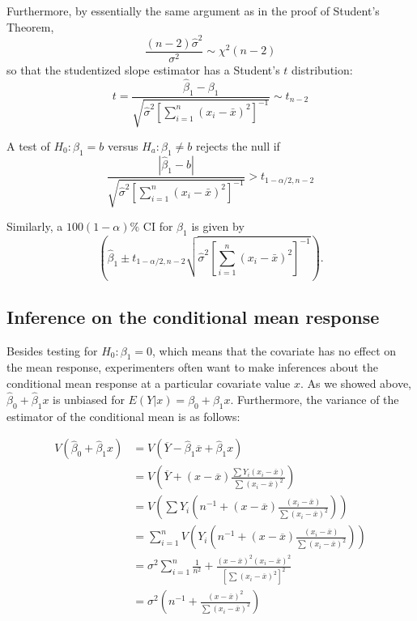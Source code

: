 \documentclass[
]{book}
\begin{document}
Furthermore, by essentially the same argument as in the proof of Student's Theorem,
\[\frac{(n-2)\hat\sigma^2}{\sigma^2}\sim \chi^2(n-2)\]
so that the studentized slope estimator has a Student's \(t\) distribution:
\[t = \frac{\hat\beta_1 - \beta_1}{\sqrt{\hat\sigma^2 \left[\sum_{i=1}^n (x_i - \bar x)^2\right]^{-1}}}\sim t_{n-2}\]

A test of \(H_0:\beta_1 = b\) versus \(H_a:\beta_1 \ne b\) rejects the null if
\[\frac{|\hat\beta_1 - b|}{\sqrt{\hat\sigma^2 \left[\sum_{i=1}^n (x_i - \bar x)^2\right]^{-1}}} > t_{1-\alpha/2, n-2}\]

Similarly, a \(100(1-\alpha)\%\) CI for \(\beta_1\) is given by
\[\left(\hat\beta_1 \pm t_{1-\alpha/2, n-2}\sqrt{\hat\sigma^2 \left[\sum_{i=1}^n (x_i - \bar x)^2\right]^{-1}}\right).\]

\hypertarget{inference-on-the-conditional-mean-response}{%
\subsection{Inference on the conditional mean response}\label{inference-on-the-conditional-mean-response}}

Besides testing for \(H_0:\beta_1 = 0\), which means that the covariate has no effect on the mean response, experimenters often want to make inferences about the conditional mean response at a particular covariate value \(x\). As we showed above, \(\hat\beta_0 + \hat\beta_1 x\) is unbiased for \(E(Y|x) = \beta_0 + \beta_1 x\). Furthermore, the variance of the estimator of the conditional mean is as follows:

\begin{align*}
V(\hat\beta_0 + \hat\beta_1 x) &= V(\overline Y - \hat\beta_1 \overline x + \hat\beta_1 x) \\
& = V\left(\overline Y + (x - \overline x)\frac{\sum Y_i(x_i - \overline x)}{\sum (x_i - \overline x)^2}\right)\\
& = V\left( \sum Y_i \left(n^{-1} + (x - \overline x)\frac{(x_i - \overline x)}{\sum (x_i - \overline x)^2}\right)\right)\\
& = \sum_{i=1}^n V\left(Y_i\left(n^{-1} + (x - \overline x)\frac{(x_i - \overline x)}{\sum (x_i - \overline x)^2}\right)\right)\\
& = \sigma^2\sum_{i=1}^n \frac{1}{n^2} + \frac{(x - \overline x)^2(x_i - \overline x)^2}{\left[\sum (x_i - \overline x)^2\right]^2}\\
& = \sigma^2\left(n^{-1} + \frac{(x - \overline x)^2}{\sum (x_i - \overline x)^2}\right)
\end{align*}
\end{document}
